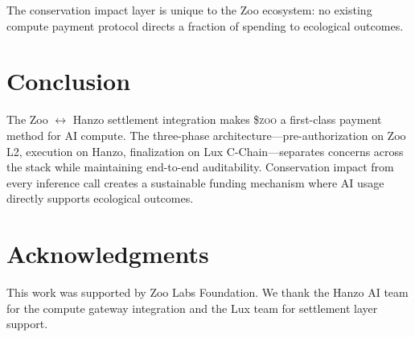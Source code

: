\documentclass[11pt,letterpaper]{article}
\newcommand{\ZOO}{\$\textsc{zoo}}
\begin{document}
The conservation impact layer is unique to the Zoo ecosystem: no existing compute payment protocol directs a fraction of spending to ecological outcomes.

\section{Conclusion}

The Zoo $\leftrightarrow$ Hanzo settlement integration makes \ZOO{} a first-class payment method for AI compute. The three-phase architecture---pre-authorization on Zoo L2, execution on Hanzo, finalization on Lux C-Chain---separates concerns across the stack while maintaining end-to-end auditability. Conservation impact from every inference call creates a sustainable funding mechanism where AI usage directly supports ecological outcomes.

\section*{Acknowledgments}

This work was supported by Zoo Labs Foundation. We thank the Hanzo AI team for the compute gateway integration and the Lux team for settlement layer support.
\end{document}
